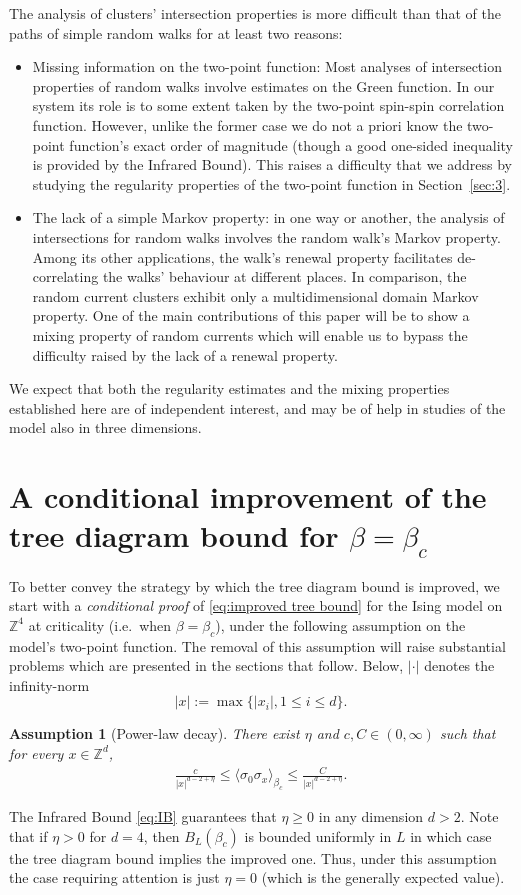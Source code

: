 \documentclass[a4paper,oneside,11pt]{article}
\def\Z{\mathbb{Z}}                          %
\newtheorem{assumption}[theorem]{Assumption}
\newcommand{\be}[1]{\begin{equation}\label{#1}}
\newcommand{\ee}{\end{equation}}
\numberwithin{equation}{section}
\numberwithin{equation}{section}
\numberwithin{equation}{section}
\def\Z{\mathbb{Z}}                          %
\def\be{\begin{equation}}
\def\ee{\end{equation}}
\begin{document}
 The analysis of clusters' intersection properties is  more difficult than that of the paths of simple random walks for at least two reasons:
  \begin{itemize}
 \item Missing information on the two-point function: Most analyses of intersection properties of random walks involve 
 estimates on the Green function.  In our system its role is to some extent taken by the two-point spin-spin correlation function.  However, unlike the former case we do not a priori know the two-point function's exact order of magnitude  (though a good one-sided inequality is provided by the Infrared Bound).  This  raises a difficulty  that we address  by studying the regularity properties of the two-point function in Section~\ref{sec:3}. 
 \item The lack of a simple Markov property:
in one way or another, the analysis of intersections for random walks involves the random walk's Markov property.  Among its other applications, the walk's renewal property facilitates de-correlating the walks' behaviour at different places.   
In comparison, the random current clusters exhibit only a multidimensional domain Markov property.   
 One of the main contributions of this paper will  be to show a mixing property of random currents which will enable us to bypass the difficulty raised by the lack of a renewal property. 
  \end{itemize}
We expect that both the regularity estimates and the mixing properties established here 
are of independent interest, and may  be of help in studies of the model also in three dimensions.

 
 \section{A conditional improvement of the tree diagram bound for $\beta = \beta_c$}
\label{sec:2}

To better convey the strategy by which the tree diagram bound is improved,  we start with a \emph{conditional proof} of \eqref{eq:improved tree bound} for the Ising model on $\Z^4$ at criticality (i.e.~when $\beta=\beta_c$),  under the following assumption on  the model's two-point function. 
The removal of this assumption will raise substantial problems which are presented in the sections that follow.  
Below, $|\cdot|$ denotes the infinity-norm
\be
|x|:=\max\{|x_i|,1\le i\le d\}.
\ee 


\begin{assumption}[Power-law decay] 
There exist $\eta$ and $c,C\in(0,\infty)$ such that for every $x\in \Z^d$,
\begin{align}\label{eq:S}
\frac{c}{|x|^{d-2+\eta}}\le \langle\sigma_0\sigma_x\rangle_{\beta_c}\le \frac{C}{|x|^{d-2+\eta}}.
\end{align}
\end{assumption}
The Infrared Bound \eqref{eq:IB} guarantees that $\eta\geq 0$ in any dimension $d>2$.
Note that if $\eta>0$ for $d=4$, then $B_L(\beta_c)$ is bounded uniformly in $L$ in which case the tree diagram bound implies the improved one.  Thus, under this assumption the case requiring attention is just  $\eta=0$ (which is the generally expected value).
\end{document}
